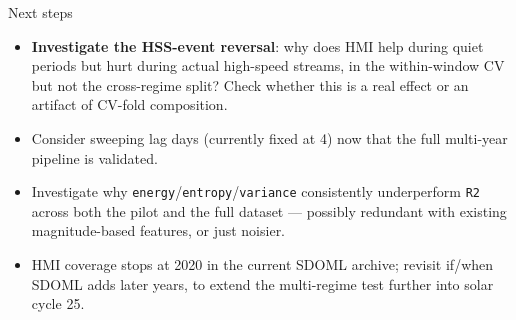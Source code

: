 \documentclass[11pt]{beamer}
\begin{document}
\begin{frame}{Next steps}
\begin{itemize}
  \item \textbf{Investigate the HSS-event reversal}: why does HMI help during quiet periods but hurt during actual high-speed streams, in the within-window CV but not the cross-regime split? Check whether this is a real effect or an artifact of CV-fold composition.
  \item Consider sweeping lag days (currently fixed at 4) now that the full multi-year pipeline is validated.
  \item Investigate why \texttt{energy}/\texttt{entropy}/\texttt{variance} consistently underperform \texttt{R2} across both the pilot and the full dataset --- possibly redundant with existing magnitude-based features, or just noisier.
  \item HMI coverage stops at 2020 in the current SDOML archive; revisit if/when SDOML adds later years, to extend the multi-regime test further into solar cycle 25.
\end{itemize}
\end{frame}
\end{document}
